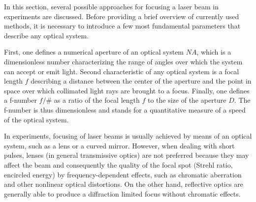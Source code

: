 In this section, several possible approaches for focusing a laser beam in experiments are discussed. Before providing a brief overview of currently used methods, it is necessary to introduce a few most fundamental parameters that describe any optical system.

First, one defines a numerical aperture of an optical system $ N\!A $, which is a dimensionless number characterizing the range of angles over which the system can accept or emit light. Second characteristic of any optical system is a focal length $ f $ describing a distance between the center of the aperture and the point in space over which collimated light rays are brought to a focus. Finally, one defines a f-number $ f/\# $ as a ratio of the focal length $ f $ to the size of the aperture $ D $. The f-number is thus dimensionless and stands for a quantitative measure of a speed of the optical system.

In experiments, focusing of laser beams is usually achieved by means of an optical system, such as a lens or a curved mirror. However, when dealing with short pulses, lenses (in general transmissive optics) are not preferred because they may affect the beam and consequently the quality of the focal spot (Strehl ratio, encircled energy) by frequency-dependent effects, such as chromatic aberration and other nonlinear optical distortions. On the other hand, reflective optics are generally able to produce a diffraction limited focus without chromatic effects.